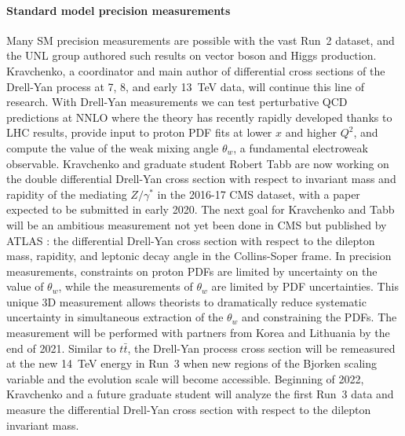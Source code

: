 \paragraph{Standard model precision measurements}
Many SM precision measurements are possible with the vast Run~2 dataset, and the UNL group authored such results on vector boson and Higgs production. Kravchenko, a coordinator and main author of differential cross sections of the Drell-Yan process at 7, 8, and early 13~TeV data, will continue this line of research. With Drell-Yan measurements we can test perturbative QCD predictions at NNLO where the theory has recently rapidly developed thanks to LHC results, provide input to proton PDF fits at lower $x$ and higher $Q^2$, and compute the value of the weak mixing angle $\theta_w$, a fundamental electroweak observable. 
Kravchenko and graduate student Robert Tabb are now working on the double differential Drell-Yan cross section with respect to invariant mass and rapidity of the mediating $Z/\gamma^*$ in the 2016-17 CMS dataset, with a paper expected to be submitted in early 2020. The next goal for Kravchenko and Tabb will be an ambitious measurement not yet been done in CMS but published by ATLAS \cite{bib:ATLAS-3D}: the differential Drell-Yan cross section with respect to the dilepton mass, rapidity, and leptonic decay angle in the Collins-Soper frame. In precision measurements, constraints on proton PDFs are limited by uncertainty on the value of $\theta_w$, while the measurements of $\theta_w$ are limited by PDF uncertainties. This unique 3D measurement allows theorists to dramatically reduce systematic uncertainty in simultaneous extraction of the $\theta_w$ and constraining the PDFs. The measurement will be performed with partners from Korea and Lithuania by the end of 2021. 
%
%
Similar to $t\bar{t}$, the Drell-Yan process cross section will be remeasured at the new 14~TeV energy in Run~3 when new regions of the Bjorken scaling variable and the evolution scale will become accessible. Beginning of 2022, Kravchenko and a future graduate student will analyze the first Run~3 data and measure the 
differential Drell-Yan cross section with respect to the dilepton invariant mass.


